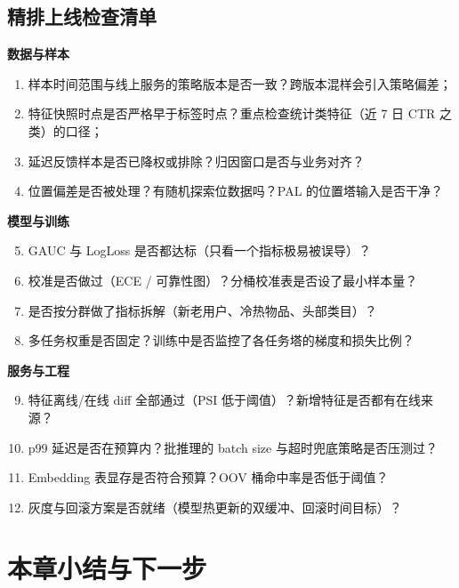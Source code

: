 \subsection{精排上线检查清单}

\begin{toolbox}
\textbf{数据与样本}
\begin{enumerate}
  \item 样本时间范围与线上服务的策略版本是否一致？跨版本混样会引入策略偏差；
  \item 特征快照时点是否严格早于标签时点？重点检查统计类特征（近 7 日 CTR 之类）的口径；
  \item 延迟反馈样本是否已降权或排除？归因窗口是否与业务对齐？
  \item 位置偏差是否被处理？有随机探索位数据吗？PAL 的位置塔输入是否干净？
\end{enumerate}
\textbf{模型与训练}
\begin{enumerate}
  \setcounter{enumi}{4}
  \item GAUC 与 LogLoss 是否都达标（只看一个指标极易被误导）？
  \item 校准是否做过（ECE / 可靠性图）？分桶校准表是否设了最小样本量？
  \item 是否按分群做了指标拆解（新老用户、冷热物品、头部类目）？
  \item 多任务权重是否固定？训练中是否监控了各任务塔的梯度和损失比例？
\end{enumerate}
\textbf{服务与工程}
\begin{enumerate}
  \setcounter{enumi}{8}
  \item 特征离线/在线 diff 全部通过（PSI 低于阈值）？新增特征是否都有在线来源？
  \item p99 延迟是否在预算内？批推理的 batch size 与超时兜底策略是否压测过？
  \item Embedding 表显存是否符合预算？OOV 桶命中率是否低于阈值？
  \item 灰度与回滚方案是否就绪（模型热更新的双缓冲、回滚时间目标）？
\end{enumerate}
\end{toolbox}

\section{本章小结与下一步}

